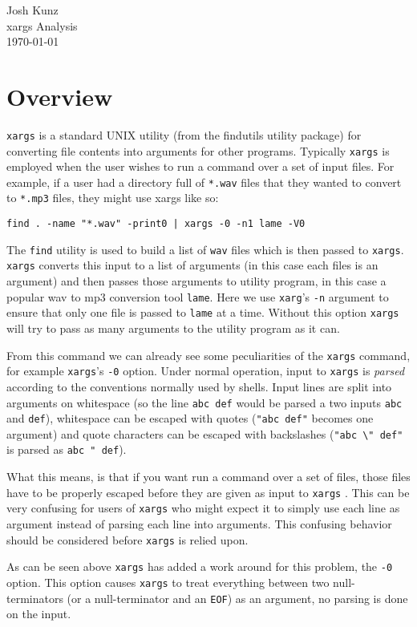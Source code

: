 \documentclass{article}
\newcommand{\header}[2]{%
    \begin{flushright}
    #1 \\
    #2 \\
    \today \\
    \end{flushright}%
}
\newcommand{\xargs}{\texttt{xargs} }
\begin{document}
\header{Josh Kunz}{xargs Analysis}
%
\vspace{-2ex}
\section{Overview}
\vspace{-1ex}
\xargs is a standard UNIX utility (from the findutils utility package) for
converting file contents into arguments for other programs. Typically \xargs is
employed when the user wishes to run a command over a set of input files. For
example, if a user had a directory full of \texttt{*.wav} files that they wanted
to convert to \texttt{*.mp3} files, they might use xargs like so:

\begin{center}
\verb$find . -name "*.wav" -print0 | xargs -0 -n1 lame -V0$
\end{center}

The \texttt{find} utility is used to build a list of \texttt{wav} files which
is then passed to \texttt{xargs}. \xargs converts this input to a list of arguments
(in this case each files is an argument) and then passes those arguments to 
utility program, in this case a popular wav to mp3 conversion tool \texttt{lame}.
Here we use \texttt{xarg}'s \verb|-n| argument to ensure that only one file is
passed to \texttt{lame} at a time. Without this option \xargs will try to pass
as many arguments to the utility program as it can.

From this command we can already see some peculiarities of the \xargs command,
for example \texttt{xargs}'s \verb|-0| option. Under normal operation, input to 
\xargs is \textit{parsed} according to the conventions normally used by shells.
Input lines are split into arguments on whitespace (so the line \texttt{abc def}
would be parsed a two inputs \texttt{abc} and \texttt{def}), whitespace can
be escaped with quotes (\texttt{"abc def"} becomes one argument) and quote
characters can be escaped with backslashes (\texttt{"abc \textbackslash" def"}
is parsed as \texttt{abc " def}).

What this means, is that if you want run a command over a set of files, those
files have to be properly escaped before they are given as input to \xargs. This
can be very confusing for users of \xargs who might expect it to simply use each
line as argument instead of parsing each line into arguments. This confusing
behavior should be considered before \xargs is relied upon.

As can be seen above \xargs has added a work around for this problem, the 
\verb|-0| option. This option causes \xargs to treat everything between two 
null-terminators (or a null-terminator and an \texttt{EOF}) as an argument, no
parsing is done on the input.
\end{document}
